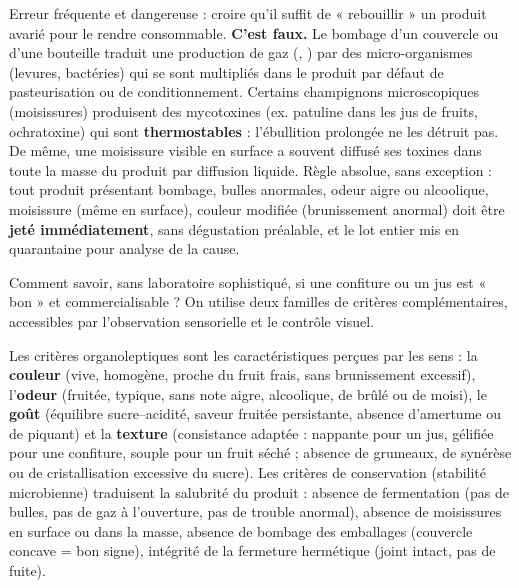 \documentclass[11pt]{article}
\newcommand{\cle}[1]{{\popxbold\color{popdark}#1}}
\newcounter{popsec}
\newcounter{popsub}
\newcommand{\courssub}[1]{%
  \stepcounter{popsub}%
  \par\vspace{9pt}\noindent{\popxbold\fontsize{11.5}{13}\selectfont\color{popink}{\color{poporange}\thepopsec.\thepopsub}\hspace{6pt}#1}\par\nopagebreak\vspace{4pt}
}
\begin{document}
\begin{attention}
Erreur fréquente et dangereuse : croire qu'il suffit de « rebouillir » un produit avarié pour le rendre consommable. \textbf{C'est faux.} Le bombage d'un couvercle ou d'une bouteille traduit une production de gaz (, ) par des micro-organismes (levures, bactéries) qui se sont multipliés dans le produit par défaut de pasteurisation ou de conditionnement. Certains champignons microscopiques (moisissures) produisent des \cle{mycotoxines} (ex. patuline dans les jus de fruits, ochratoxine) qui sont \textbf{thermostables} : l'ébullition prolongée ne les détruit pas. De même, une moisissure visible en surface a souvent diffusé ses toxines dans toute la masse du produit par diffusion liquide. Règle absolue, sans exception : tout produit présentant bombage, bulles anormales, odeur aigre ou alcoolique, moisissure (même en surface), couleur modifiée (brunissement anormal) doit être \textbf{jeté immédiatement}, sans dégustation préalable, et le lot entier mis en quarantaine pour analyse de la cause.
\end{attention}

\courssub{Évaluer la qualité d'un produit transformé}

Comment savoir, sans laboratoire sophistiqué, si une confiture ou un jus est « bon » et commercialisable ? On utilise deux familles de critères complémentaires, accessibles par l'observation sensorielle et le contrôle visuel.

\begin{definition}
Les \cle{critères organoleptiques} sont les caractéristiques perçues par les sens : la \textbf{couleur} (vive, homogène, proche du fruit frais, sans brunissement excessif), l'\textbf{odeur} (fruitée, typique, sans note aigre, alcoolique, de brûlé ou de moisi), le \textbf{goût} (équilibre sucre--acidité, saveur fruitée persistante, absence d'amertume ou de piquant) et la \textbf{texture} (consistance adaptée : nappante pour un jus, gélifiée pour une confiture, souple pour un fruit séché ; absence de grumeaux, de synérèse ou de cristallisation excessive du sucre). Les \cle{critères de conservation (stabilité microbienne)} traduisent la salubrité du produit : absence de fermentation (pas de bulles, pas de gaz à l'ouverture, pas de trouble anormal), absence de moisissures en surface ou dans la masse, absence de bombage des emballages (couvercle concave = bon signe), intégrité de la fermeture hermétique (joint intact, pas de fuite).
\end{definition}
\end{document}

